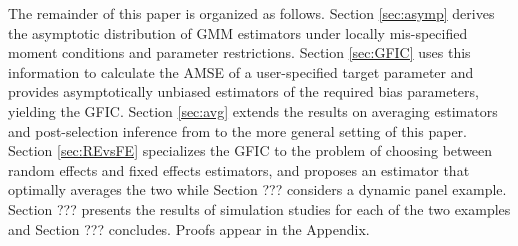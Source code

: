 The remainder of this paper is organized as follows. Section \ref{sec:asymp} derives the asymptotic distribution of GMM estimators under locally mis-specified moment conditions and parameter restrictions. 
Section \ref{sec:GFIC} uses this information to calculate the AMSE of a user-specified target parameter and provides asymptotically unbiased estimators of the required bias parameters, yielding the GFIC. 
Section \ref{sec:avg} extends the results on averaging estimators and post-selection inference from \cite{DiTraglia2016} to the more general setting of this paper.
Section \ref{sec:REvsFE} specializes the GFIC to the problem of choosing between random effects and fixed effects estimators, and proposes an estimator that optimally averages the two while Section ??? considers a dynamic panel example.
Section ??? presents the results of simulation studies for each of the two examples and Section ??? concludes. 
Proofs appear in the Appendix.

